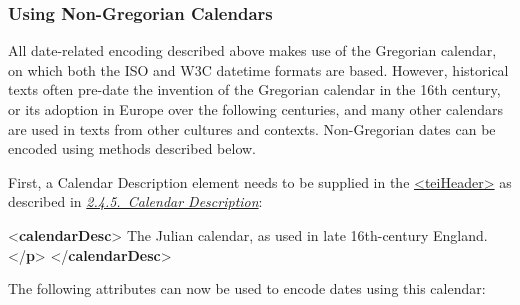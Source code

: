 \subsubsection[{Using Non-Gregorian Calendars}]{Using Non-Gregorian Calendars}\label{NDDATECUSTOM}\par
All date-related encoding described above makes use of the Gregorian calendar, on which both the ISO and W3C datetime formats are based. However, historical texts often pre-date the invention of the Gregorian calendar in the 16th century, or its adoption in Europe over the following centuries, and many other calendars are used in texts from other cultures and contexts. Non-Gregorian dates can be encoded using methods described below.\par
First, a Calendar Description element needs to be supplied in the \hyperref[TEI.teiHeader]{<teiHeader>} as described in \textit{\hyperref[HD44]{2.4.5.\ Calendar Description}}:\par\bgroup{}\exampleFont \begin{shaded}\noindent\mbox{}{<\textbf{calendarDesc}>}\mbox{}\newline 
{}\mbox{}\newline 
\hspace*{1em}The Julian calendar, as used in late 16th-century England.{</\textbf{p}>}\mbox{}\newline 
{}\mbox{}\newline 
{</\textbf{calendarDesc}>}\end{shaded}\egroup\par \par
The following attributes can now be used to encode dates using this calendar: 
